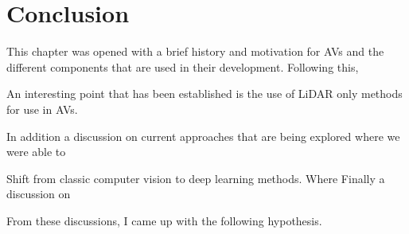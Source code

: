%
%
%
%
%
%
%
%
\section{Conclusion} 

This chapter was opened with a brief history and motivation for AVs and the different components that are used in their development. Following this, 
 
 An interesting point that has been established is the use of LiDAR only methods for use in AVs. 
 
 

In addition a discussion on current approaches that are being explored 
where we were able to 

Shift from classic computer vision to deep learning methods. Where 
Finally a discussion on 

From these discussions, I came up with the following hypothesis. 